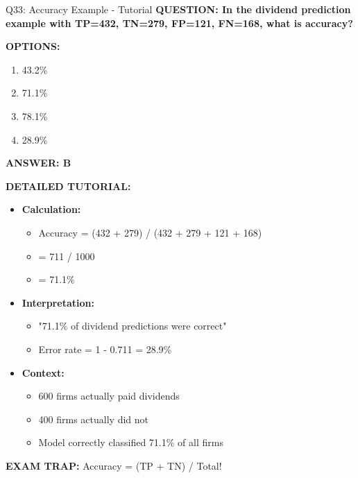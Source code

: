 \documentclass[8pt]{beamer}
\begin{document}
	\begin{frame}{Q33: Accuracy Example - Tutorial}
		\fontsize{6.5}{7.5}\selectfont
		\textbf{QUESTION: In the dividend prediction example with TP=432, TN=279, FP=121, FN=168, what is accuracy?}
		
		\vspace{0.1cm}
		\textbf{OPTIONS:}
		\begin{enumerate}
			\item 43.2\%
			\item 71.1\%
			\item 78.1\%
			\item 28.9\%
		\end{enumerate}
		
		\vspace{0.1cm}
		\textcolor{myblue}{\textbf{ANSWER: B}}
		
		\vspace{0.1cm}
		\textbf{DETAILED TUTORIAL:}
		\begin{itemize}
			\item \textbf{Calculation:}
			\begin{itemize}
				\item Accuracy = (432 + 279) / (432 + 279 + 121 + 168)
				\item = 711 / 1000
				\item = 71.1\%
			\end{itemize}
			\item \textbf{Interpretation:}
			\begin{itemize}
				\item "71.1\% of dividend predictions were correct"
				\item Error rate = 1 - 0.711 = 28.9\%
			\end{itemize}
			\item \textbf{Context:}
			\begin{itemize}
				\item 600 firms actually paid dividends
				\item 400 firms actually did not
				\item Model correctly classified 71.1\% of all firms
			\end{itemize}
		\end{itemize}
		
		\textcolor{myred}{\textbf{EXAM TRAP:}} Accuracy = \textcolor{myblue}{(TP + TN) / Total}!
	\end{frame}
	
\end{document}

